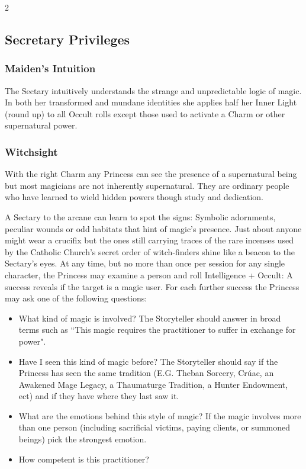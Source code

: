 \begin{multicols}{2}
\begin{mybox}
\end{mybox}

\subsection*{Secretary Privileges}
\subsubsection*{Maiden's Intuition}

The Sectary intuitively understands the strange and unpredictable logic of magic. In both her transformed and mundane identities she applies half her Inner Light (round up) to all Occult rolls except those used to activate a Charm or other supernatural power. 

\subsubsection*{Witchsight}

With the right Charm any Princess can see the presence of a supernatural being but most magicians are not inherently supernatural. They are ordinary people who have learned to wield hidden powers though study and dedication.

A Sectary to the arcane can learn to spot the signs: Symbolic adornments, peculiar wounds or odd habitats that hint of magic's presence. Just about anyone might wear a crucifix but the ones still carrying traces of the rare incenses used by the Catholic Church's secret order of witch-finders shine like a beacon to the Sectary's eyes. At any time, but no more than once per session for any single character, the Princess may examine a person and roll Intelligence + Occult: A success reveals if the target is a magic user. For each further success the Princess may ask one of the following questions:
\begin{itemize}\item What kind of magic is involved? The Storyteller should answer in broad terms such as \textquotedblleft This magic requires the practitioner to suffer in exchange for power".
\item Have I seen this kind of magic before? The Storyteller should say if the Princess has seen the same tradition (E.G. Theban Sorcery, Cr\'{u}ac, an Awakened Mage Legacy, a Thaumaturge Tradition, a Hunter Endowment, ect) and if they have where they last saw it.
\item What are the emotions behind this style of magic? If the magic involves more than one person (including sacrificial victims, paying clients, or summoned beings) pick the strongest emotion.
\item How competent is this practitioner?\end{itemize}


\end{multicols}
